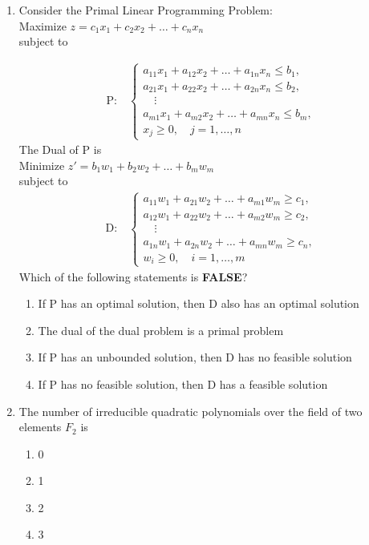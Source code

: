 \documentclass[journal]{IEEEtran}
\numberwithin{equation}{enumi}
\numberwithin{figure}{enumi}
\begin{document}
\begin{enumerate}
\item  Consider the Primal Linear Programming Problem: \\
Maximize  $z = c_1x_1 + c_2x_2 + \dots + c_nx_n$  \\
subject to \hfill{}

\begin{align*}
\text{P:} \quad
\begin{cases}
a_{11}x_1 + a_{12}x_2 + \dots + a_{1n}x_n \le b_1, \\
a_{21}x_1 + a_{22}x_2 + \dots + a_{2n}x_n \le b_2, \\
\quad \vdots \\
a_{m1}x_1 + a_{m2}x_2 + \dots + a_{mn}x_n \le b_m, \\
x_j \ge 0, \quad j=1,\dots,n
\end{cases}
\end{align*}
The Dual of P is \\
Minimize \quad $z' = b_1w_1 + b_2w_2 + \dots + b_mw_m$ \\
subject to
\begin{align*}
\text{D:} \quad
\begin{cases}
a_{11}w_1 + a_{21}w_2 + \dots + a_{m1}w_m \ge c_1, \\
a_{12}w_1 + a_{22}w_2 + \dots + a_{m2}w_m \ge c_2, \\
\quad \vdots \\
a_{1n}w_1 + a_{2n}w_2 + \dots + a_{mn}w_m \ge c_n, \\
w_i \ge 0, \quad i=1,\dots,m
\end{cases}
\end{align*}
Which of the following statements is \textbf{FALSE}?
\begin{enumerate}
\item  If P has an optimal solution, then D also has an optimal solution 
\item  The dual of the dual problem is a primal problem 
\item  If P has an unbounded solution, then D has no feasible solution 
\item  If P has no feasible solution, then D has a feasible solution
\end{enumerate}


\item The number of irreducible quadratic polynomials over the field of two elements $F_2$ is
\hfill{}
\begin{multicols}{4}
\begin{enumerate}
    \item 0
    \item 1
    \item 2
    \item 3
\end{enumerate}
\end{multicols}




\end{enumerate}
\end{document}
